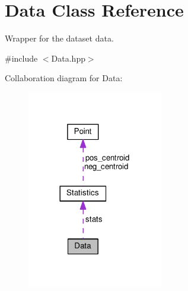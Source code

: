 \hypertarget{class_data}{}\section{Data Class Reference}
\label{class_data}


Wrapper for the dataset data.  




{\ttfamily \#include $<$Data.\+hpp$>$}



Collaboration diagram for Data\+:\nopagebreak
\begin{figure}[H]
\begin{center}
\leavevmode
\includegraphics[width=168pt]{class_data__coll__graph}
\end{center}
\end{figure}
